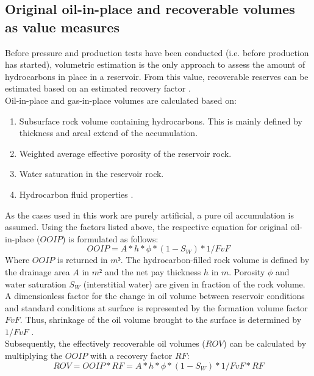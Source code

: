         \subsection{Original oil-in-place and recoverable volumes as value measures}
        Before pressure and production tests have been conducted (i.e. before production has started), volumetric estimation is the only approach to assess the amount of hydrocarbons in place in a reservoir. From this value, recoverable reserves can be estimated based on an estimated recovery factor \citep{dean2007volumetric}.\\
        Oil-in-place and gas-in-place volumes are calculated based on:
        \begin{enumerate}
        \item Subsurface rock volume containing hydrocarbons. This is mainly defined by thickness and areal extend of the accumulation.
        \item Weighted average effective porosity of the reservoir rock.
        \item Water saturation in the reservoir rock.
        \item Hydrocarbon fluid properties \citep{dean2007volumetric}.
        \end{enumerate}
        As the cases used in this work are purely artificial, a pure oil accumulation is assumed. Using the factors listed above, the respective equation for original oil-in-place ($OOIP$) is formulated as follows:
        \begin{equation}\label{eq:OOIP}
        OOIP = A * h * \phi * (1 - S_W) * 1/FvF
        \end{equation}
        Where $OOIP$ is returned in $m³$. The hydrocarbon-filled rock volume is defined by the drainage area $A$ in $m²$ and the net pay thickness $h$ in $m$. Porosity $\phi$ and water saturation $S_W$ (interstitial water) are given in fraction of the rock volume. A dimensionless factor for the change in oil volume between reservoir conditions and standard conditions at surface is represented by the formation volume factor $FvF$. Thus, shrinkage of the oil volume brought to the surface is determined by $1/FvF$ \citep{dean2007volumetric}.\\
        Subsequently, the effectively recoverable oil volumes ($ROV$) can be calculated by multiplying the $OOIP$ with a recovery factor $RF$:
        \begin{equation}\label{eq:ROV}
                ROV = OOIP * RF = A * h * \phi * (1 - S_W) * 1/FvF * RF
        \end{equation}
